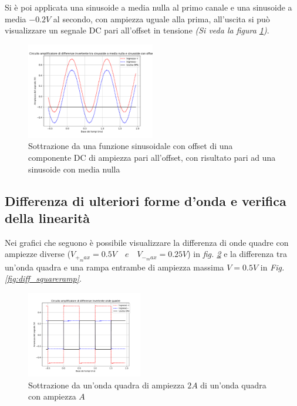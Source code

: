 \documentclass[journal]{IEEEtran}
\begin{document}
Si è poi applicata una sinusoide a media nulla al primo canale e una sinusoide a media $-0.2 V$ al secondo, con ampiezza uguale alla prima, all'uscita si può visualizzare un segnale DC pari all'offset in tensione \textit{(Si veda la figura \ref{fig:diff3})}. 

\begin{figure}[H]%
\begin {center}
\includegraphics[width=0.50\textwidth]{analysis/output/OPA_diff_sin3.pdf}
\caption{Sottrazione da una funzione sinusoidale con offset di una componente DC di ampiezza pari all'offset, con risultato pari ad una sinusoide con media nulla}
\label{fig:diff3}
\end {center}
\end{figure}

\subsection{\textbf{Differenza di ulteriori forme d'onda e verifica della linearità}}
Nei grafici che seguono è possibile visualizzare la differenza di onde quadre con ampiezze diverse ($V_{+_max} = 0.5V \quad e \quad V_{-_max} = 0.25V$) in \textit{fig. \ref{fig:diff_square}}
e la differenza tra un'onda quadra e una rampa entrambe di ampiezza massima $V=0.5V$ in \textit{Fig. \ref{fig:diff_squareramp}}.

\begin{figure}[H]%
\begin {center}
\includegraphics[width=0.45\textwidth]{analysis/output/OPA_diff_square.pdf}
\caption{Sottrazione da un'onda quadra di ampiezza $2A$ di un'onda quadra con ampiezza $A$}
\label{fig:diff_square}
\end {center}
\end{figure}
\end{document}
